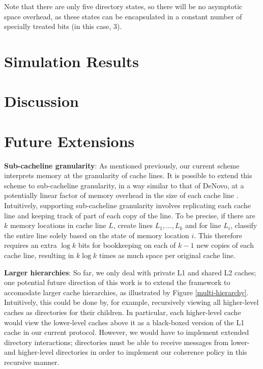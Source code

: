 \documentclass{article}
\begin{document}
Note that there are only five directory states, so there will be no asymptotic space overhead, as these states can be encapsulated in a constant number of specially treated bits (in this case, 3). 


\section{Simulation Results}

\section{Discussion}

\section{Future Extensions}
\textbf{Sub-cacheline granularity}: As mentioned previously, our current scheme interprets memory at the granularity of cache lines. It is possible to extend this scheme to sub-cacheline granularity, in a way similar to that of DeNovo, at a potentially linear factor of memory overhead in the size of each cache line \cite{choi2010denovo}. Intuitively, supporting sub-cacheline granularity involves replicating each cache line and keeping track of part of each copy of the line. To be precise, if there are $k$ memory locations in cache line $L$, create lines $L_1, \dots, L_k$ and for line $L_i$, classify the entire line solely based on the state of memory location $i$. This therefore requires an extra $\log k$ bits for bookkeeping on each of $k-1$ new copies of each cache line, resulting in $k \log k$ times as much space per original cache line.

\textbf{Larger hierarchies}: So far, we only deal with private L1 and shared L2 caches; one potential future direction of this work is to extend the framework to accomodate larger cache hierarchies, as illustrated by Figure \ref{multi-hierarchy}. Intuitively, this could be done by, for example, recursively viewing all higher-level caches as directories for their children. In particular, each higher-level cache would view the lower-level caches above it as a black-boxed version of the L1 cache in our current protocol. However, we would have to implement extended directory interactions; directories must be able to receive messages from lower- and higher-level directories in order to implement our coherence policy in this recursive manner.
\end{document}
